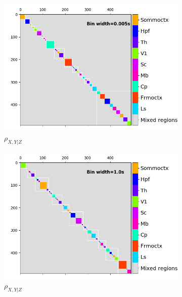   \begin{figure}[p]
    \begin{subfigure}[h]{0.5\linewidth}
      \includegraphics[width=\linewidth]{figures/eight_probe/Krebs_0p005_conditional_rectified_regional_cluster_map.png}
      \caption{$\rho_{X,Y|Z}$}
      \label{fig:short_time_conditional_rectified_regional_clusters}
    \end{subfigure}
    \begin{subfigure}[h]{0.5\linewidth}
      \includegraphics[width=\linewidth]{figures/eight_probe/Krebs_1p0_conditional_rectified_regional_cluster_map.png}
      \caption{$\rho_{X,Y|Z}$}
      \label{fig:long_time_conditional_rectified_regional_clusters}
    \end{subfigure}
    \begin{subfigure}[h]{0.5\linewidth}

\end{subfigure}
\end{figure}

